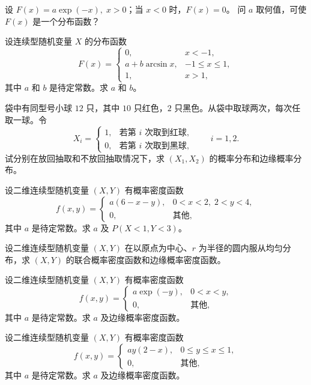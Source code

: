 \begin{homework}[2.24]
设 $F(x) = a \exp(-x), \; x > 0$；当 $x < 0$ 时，$F(x) = 0$。  
问 $a$ 取何值，可使 $F(x)$ 是一个分布函数？
\end{homework}

\begin{homework}[2.25]
设连续型随机变量 $X$ 的分布函数
\[
F(x) =
\begin{cases}
0, & x < -1, \\[6pt]
a + b \arcsin x, & -1 \leq x \leq 1, \\[6pt]
1, & x > 1,
\end{cases}
\]
其中 $a$ 和 $b$ 是待定常数。求 $a$ 和 $b$。
\end{homework}

\begin{homework}[2.26]
袋中有同型号小球 $12$ 只，其中 $10$ 只红色，$2$ 只黑色。从袋中取球两次，每次任取一球。令
\[
X_i =
\begin{cases}
1, & \text{若第 } i \text{ 次取到红球},\\[4pt]
0, & \text{若第 } i \text{ 次取到黑球},
\end{cases}
\qquad i = 1,2.
\]
试分别在放回抽取和不放回抽取情况下，求 $(X_1, X_2)$ 的概率分布和边缘概率分布。
\end{homework}

\begin{homework}[2.27]
设二维连续型随机变量 $(X,Y)$ 有概率密度函数
\[
f(x,y) =
\begin{cases}
a(6 - x - y), & 0 < x < 2,\; 2 < y < 4, \\[6pt]
0, & \text{其他},
\end{cases}
\]
其中 $a$ 是待定常数。求 $a$ 及 $P(X < 1, Y < 3)$。
\end{homework}

\begin{homework}[2.28]
设二维连续型随机变量 $(X,Y)$ 在以原点为中心、$r$ 为半径的圆内服从均匀分布，求 $(X,Y)$ 的联合概率密度函数和边缘概率密度函数。
\end{homework}

\begin{homework}[2.29]
设二维连续型随机变量 $(X,Y)$ 有概率密度函数
\[
f(x,y) =
\begin{cases}
a \exp(-y), & 0 < x < y, \\[6pt]
0, & \text{其他},
\end{cases}
\]
其中 $a$ 是待定常数。求 $a$ 及边缘概率密度函数。
\end{homework}

\begin{homework}[2.30]
设二维连续型随机变量 $(X,Y)$ 有概率密度函数
\[
f(x,y) =
\begin{cases}
a y (2 - x), & 0 \leq y \leq x \leq 1, \\[6pt]
0, & \text{其他},
\end{cases}
\]
其中 $a$ 是待定常数。求 $a$ 及边缘概率密度函数。
\end{homework}

